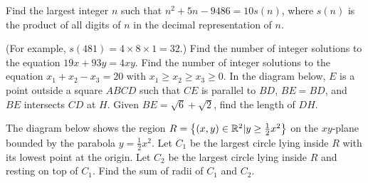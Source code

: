 \begin{enumerate}
\begin{center}
    \end{center}
    \hyperrefitem[A::2022-O-1-16] Find the largest integer $n$ such that $n^2 + 5n - 9486 = 10s(n)$, where $s(n)$ is the product of all digits of $n$ in the decimal representation of $n$.
    
    (For example, $s(481) = 4 \times 8 \times 1 = 32.$)
    \hyperrefitem[A::2022-O-1-17] Find the number of integer solutions to the equation $19x + 93y = 4xy$.
    \hyperrefitem[A::2022-O-1-18] Find the number of integer solutions to the equation $x_1 + x_2 - x_3 = 20$ with $x_1 \geq x_2 \geq x_3 \geq 0$.
    \hyperrefitem[A::2022-O-1-19] In the diagram below, $E$ is a point outside a square $ABCD$ such that $CE$ is parallel to $BD$, $BE = BD$, and $BE$ intersects $CD$ at $H$. Given $BE = \sqrt6 + \sqrt2$, find the length of $DH$.

    \begin{center}
    \end{center}
    \hyperrefitem[A::2022-O-1-20] The diagram below shows the region $R = \left\lbrace (x, y) \in \mathbb{R}^2 | y \geq \frac12 x^2 \right\rbrace$ on the $xy$-plane bounded by the parabola $y = \frac12 x^2$. Let $C_1$ be the largest circle lying inside $R$ with its lowest point at the origin. Let $C_2$ be the largest circle lying inside $R$ and resting on top of $C_1$. Find the sum of radii of $C_1$ and $C_2$.
    
    \begin{center}
\end{center}
\end{enumerate}

